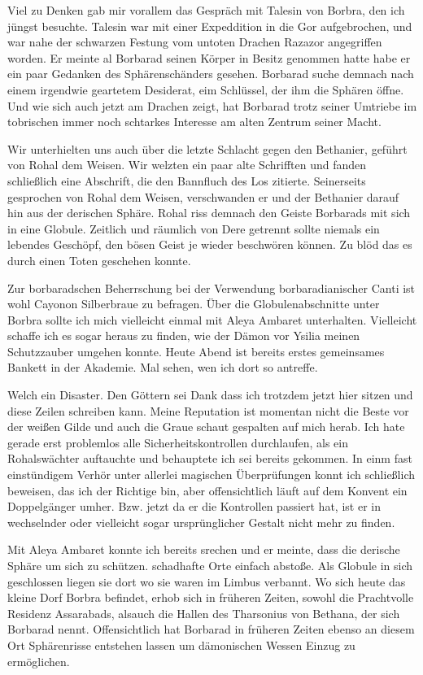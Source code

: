 Viel zu Denken gab mir vorallem das Gespräch mit Talesin von Borbra, den ich jüngst besuchte. Talesin war mit einer Expeddition in die Gor aufgebrochen, und war nahe der schwarzen Festung vom untoten Drachen Razazor angegriffen worden.
Er meinte al Borbarad seinen Körper in Besitz genommen hatte habe er ein paar Gedanken des Sphärenschänders gesehen. Borbarad suche demnach nach einem irgendwie geartetem Desiderat, eim Schlüssel, der ihm die Sphären öffne. Und wie sich auch jetzt am Drachen zeigt, hat Borbarad trotz seiner Umtriebe im tobrischen immer noch schtarkes Interesse am alten Zentrum seiner Macht.

Wir unterhielten uns auch über die letzte Schlacht gegen den Bethanier, geführt von Rohal dem Weisen. Wir welzten ein paar alte Schrifften und fanden schließlich eine Abschrift, die den Bannfluch des Los zitierte. Seinerseits gesprochen von Rohal dem Weisen, verschwanden er und der Bethanier darauf hin aus der derischen Sphäre. Rohal riss demnach den Geiste Borbarads mit sich in eine Globule. Zeitlich und räumlich von Dere getrennt sollte niemals ein lebendes Geschöpf, den bösen Geist je wieder beschwören können. Zu blöd das es durch einen Toten geschehen konnte.

Zur borbaradschen Beherrschung bei der Verwendung borbaradianischer Canti ist wohl Cayonon Silberbraue zu befragen. Über die Globulenabschnitte unter Borbra sollte ich mich vielleicht einmal mit Aleya Ambaret unterhalten. Vielleicht schaffe ich es sogar heraus zu finden, wie der Dämon vor Ysilia meinen Schutzzauber umgehen konnte.
Heute Abend ist bereits erstes gemeinsames Bankett in der Akademie. Mal sehen, wen ich dort so antreffe.

Welch ein Disaster. Den Göttern sei Dank dass ich trotzdem jetzt hier sitzen und diese Zeilen schreiben kann.
Meine Reputation ist momentan nicht die Beste vor der weißen Gilde und auch die Graue schaut gespalten auf mich herab. Ich hate gerade erst problemlos alle Sicherheitskontrollen durchlaufen, als ein Rohalswächter auftauchte und behauptete ich sei bereits gekommen. In einm fast einstündigem Verhör unter allerlei magischen Überprüfungen konnt ich schließlich beweisen, das ich der Richtige bin, aber offensichtlich läuft auf dem Konvent ein Doppelgänger umher. Bzw. jetzt da er die Kontrollen passiert hat, ist er in wechselnder oder vielleicht sogar ursprünglicher Gestalt nicht mehr zu finden.

Mit Aleya Ambaret konnte ich bereits srechen und er meinte, dass die derische Sphäre um sich zu schützen. schadhafte Orte einfach abstoße. Als Globule in sich geschlossen liegen sie dort wo sie waren im Limbus verbannt. Wo sich heute das kleine Dorf Borbra befindet, erhob sich in früheren Zeiten, sowohl die Prachtvolle Residenz Assarabads, alsauch die Hallen des Tharsonius von Bethana, der sich Borbarad nennt. Offensichtlich hat Borbarad in früheren Zeiten ebenso an diesem Ort Sphärenrisse entstehen lassen um dämonischen Wessen Einzug zu ermöglichen.

